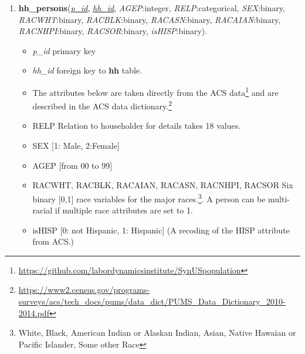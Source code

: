 \documentclass{amsart}
\begin{document}
{\begin{enumerate}
\item \textbf{hh\_persons}(\underline{\textit{p\_id}}, \underline{\textit{hh\_id}}, \textit{AGEP}:integer, \textit{RELP}:categorical, \textit{SEX}:binary,  \textit{RACWHT}:binary, \textit{RACBLK}:binary, \textit{RACASN}:binary, \textit{RACAIAN}:binary, \textit{RACNHPI}:binary, \textit{RACSOR}:binary, \textit{isHISP}:binary). 
\begin{itemize}
\item \textit{p\_id} primary key
\item \textit{hh\_id} foreign key to \textbf{hh} table.  
\item The attributes below are taken directly from the ACS data\footnote{\url{https://github.com/labordynamicsinstitute/SynUSpopulation}} and are described in the ACS data dictionary.\footnote{\label{note1}\url{https://www2.census.gov/programs-surveys/acs/tech_docs/pums/data_dict/PUMS_Data_Dictionary_2010-2014.pdf}}
\item RELP Relation to householder for details takes 18 values.  
\item SEX  [1: Male, 2:Female]
\item AGEP [from 00 to 99]
\item RACWHT, RACBLK, RACAIAN, RACASN, RACNHPI, RACSOR Six binary [0,1] race variables for the major races.\footnote{White, Black, American Indian or Alaskan Indian, Asian, Native Hawaian or Pacific Islander, Some other Race}. A person can be multi-racial if multiple race attributes are set to 1.
\item isHISP [0: not Hispanic, 1: Hispanic]  (A recoding of the HISP attribute from ACS.)
\end{itemize}


\end{enumerate}}
\end{document}
